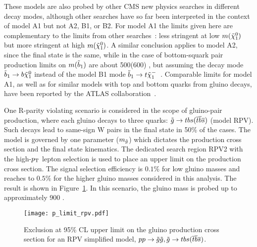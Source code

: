 These models are also probed by other CMS new physics searches in
different decay modes, although other searches have so far been
interpreted in the context of model A1 but not A2, B1, or B2. For model
A1 the limits given here are complementary to the limits from other
searches~\cite{maria,Chatrchyan:2012wa,Chatrchyan:2013lya,Chatrchyan:2013wxa}:
less stringent at low $m(\tilde{\chi}^{0}_1)$ but more stringent at high $m(\tilde{\chi}^{0}_1)$.
A similar conclusion applies to model A2, since the final state is the same,
while in the case of bottom-squark pair production limits on $m(\tilde{\relax{b}}_1)$ are
about 500(600) \GeV, but assuming the decay mode $\tilde{\relax{b}}_1 \to \relax{b} \tilde{\chi}^{0}_1$
instead of the model B1 mode $\tilde{\relax{b}}_1 \to \relax{t} \tilde{\chi}^{-}_1$~\cite{ATLAS:2011cw}.
Comparable limits for model A1, as well as for similar models with top
and bottom quarks from gluino decays, have been reported by the ATLAS
collaboration~\cite{ATLAS:2012ai,ATLAS:2012ah,ATLAS:2012pq,ATLAS:2012naa}.

One R-parity violating scenario is considered in the scope of gluino-pair
production, where each gluino decays to three quarks: $\tilde{\relax{g}}\to\relax{t}\relax{b}\relax{s}
(\overline{\relax{t}}\overline{\relax{b}}\overline{\relax{s}})$ (model RPV). Such decays lead to same-sign W pairs in
the final state in 50\% of the cases. The model is governed by one parameter
($m_{\tilde{\relax{g}}}$) which dictates the production cross section and the final state
kinematics. The dedicated search region RPV2 with the high-$p_{\mathrm{T}}$ lepton selection
is used to place an upper limit on the production cross section. The signal
selection efficiency is $0.1\%$ for low gluino masses and reaches to $0.5\%$
for the higher gluino masses considered in this analysis. The result is shown
in Figure~\ref{fig:results_limit_rpv}. In this scenario, the gluino mass is probed up to
approximately 900 \GeV.

\begin{figure}
\begin{center}
\texttt{[image: p\_limit\_rpv.pdf]}
\caption[Exclusion curve for RPV model]
{\label{fig:results_limit_rpv}
Exclusion at 95\% CL upper limit on the gluino production cross section for
an RPV simplified model, $pp \to \tilde{\relax{g}} \tilde{\relax{g}}, \tilde{\relax{g}} \to \relax{t}\relax{b}\relax{s}
(\overline{\relax{t}}\overline{\relax{b}}\overline{\relax{s}})$.
}
\end{center}
\end{figure}
